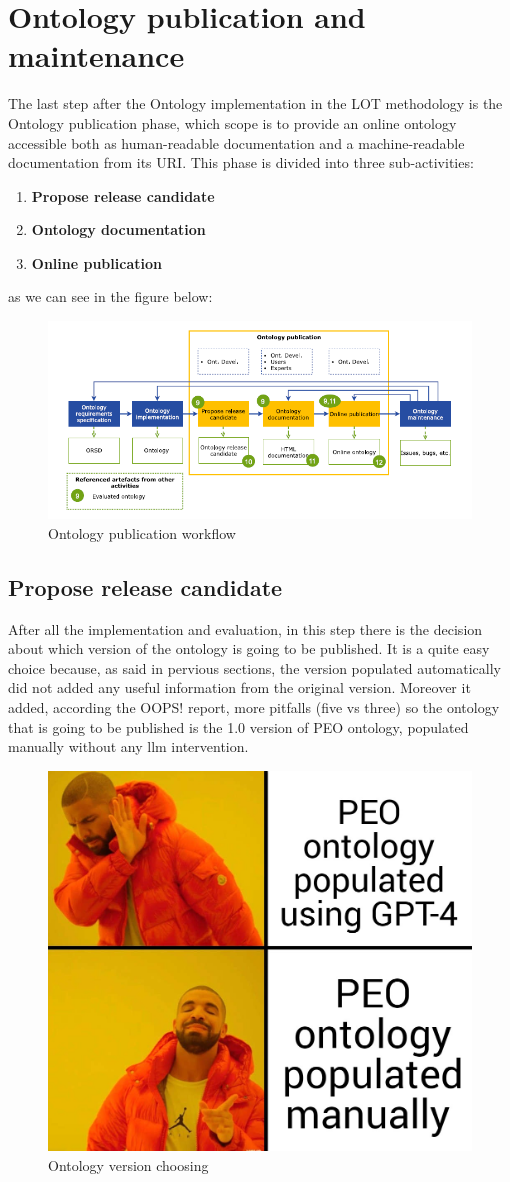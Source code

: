 \newpage
\section{Ontology publication and maintenance}
The last step after the Ontology implementation in the LOT methodology is the Ontology publication phase, which scope is to provide an online ontology accessible both as human-readable documentation and a machine-readable documentation from its URI. This phase is divided into three sub-activities:
\begin{enumerate}
    \item \textbf{Propose release candidate}
    \item \textbf{Ontology documentation}
    \item \textbf{Online publication}
\end{enumerate}
as we can see in the figure below:
\begin{figure}[H]
    \centering
    \includegraphics[width=0.9\linewidth]{Figures/fig_25.png}
    \caption{Ontology publication workflow}
    \label{fig:enter-label}
\end{figure}

\subsection{Propose release candidate}
After all the implementation and evaluation, in this step there is the decision about which version of the ontology is going to be published. It is a quite easy choice because, as said in pervious sections, the version populated automatically did not added any useful information from the original version. Moreover it added, according the OOPS! report, more pitfalls (five vs three) so the ontology that is going to be published is the 1.0 version of PEO ontology, populated manually without any llm intervention.
\begin{figure}[H]
    \centering
    \includegraphics[width=0.36\linewidth]{Figures/fig_64.jpg}
    \caption{Ontology version choosing}
    \label{fig:enter-label}
\end{figure}

